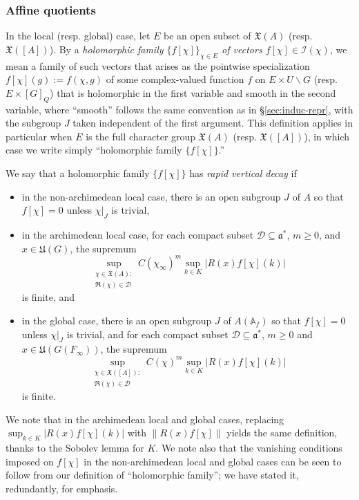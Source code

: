 \documentclass[reqno]{amsart}
\theoremstyle{plain} \newtheorem{theorem} {Theorem}
\theoremstyle{definition} \newtheorem{definition} [theorem] {Definition}
\theoremstyle{itplain} %
\numberwithin{equation}{section}
\numberwithin{theorem}{section}
\renewcommand{\geq}{\geqslant}
\begin{document}
\subsubsection{Affine quotients}\label{sec:mellin-paley-affine-quotients}
In the local (resp. global) case, let $E$ be an open subset of $\mathfrak{X}(A)$ (resp. $\mathfrak{X}([A])$).  By a \emph{holomorphic family $\{f[\chi]\}_{\chi \in E}$ of vectors $f[\chi] \in \mathcal{I}(\chi)$}, we mean a family of such vectors that arises as the pointwise specialization $f[\chi](g) := f(\chi,g)$ of some complex-valued function $f$ on $E \times U \backslash G$ (resp. $E \times [G]_Q$) that is holomorphic in the first variable and smooth in the second variable, where ``smooth'' follows the same convention as in \S\ref{sec:induc-repr}, with the subgroup $J$ taken independent of the first argument.  This definition applies in particular when $E$ is the full character group $\mathfrak{X}(A)$ (resp. $\mathfrak{X}([A])$), in which case we write simply ``holomorphic family $\{f[\chi]\}$.''

We say that a holomorphic family $\{f[\chi]\}$ has \emph{rapid vertical decay} if
\begin{itemize}
\item in the non-archimedean local case, there is an open subgroup $J$ of $A$ so that $f[\chi] = 0$ unless $\chi|_J$ is trivial,
\item in the archimedean local case, for each compact subset $\mathcal{D} \subseteq \mathfrak{a}^*$, $m \geq 0$, and $x \in \mathfrak{U}(G)$, the supremum
  \begin{equation}\label{eq:sup_chi-in-mathfr-1}
    \sup_{
      \substack{
        \chi \in \mathfrak{X}(A) :  \\
         \Re(\chi) \in \mathcal{D}
      }
    } C(\chi_\infty)^m \sup_{k \in K} |R(x) f[\chi](k)|
\end{equation}
is finite, and
\item in the global case, there is an open subgroup $J$ of $A(\mathbb{A}_f)$ so that $f[\chi] = 0$ unless $\chi|_J$ is trivial, and for each compact subset $\mathcal{D} \subseteq \mathfrak{a}^*$, $m \geq 0$ and $x \in \mathfrak{U}(G(F_\infty))$, the supremum
  \begin{equation}\label{eq:sup_-substack-chi}
    \sup_{
      \substack{
        \chi \in \mathfrak{X}([A]) :  \\
          \Re(\chi) \in \mathcal{D}
      }
    }  C(\chi)^m \sup_{k \in K} |R(x) f[\chi](k)|
  \end{equation}
  is finite.
\end{itemize}
We note that in the archimedean local and global cases, replacing $\sup_{k \in K} |R(x) f[\chi](k)|$ with $\|R(x) f[\chi] \|$ yields the same definition, thanks to the Sobolev lemma for $K$.  We note also that the vanishing conditions imposed on $f[\chi]$ in the non-archimedean local and global cases can be seen to follow from our definition of ``holomorphic family''; we have stated it, redundantly, for emphasis.
\end{document}
